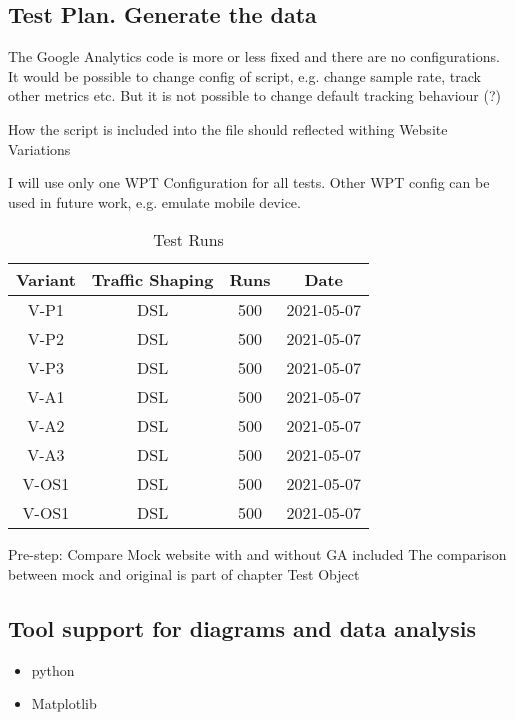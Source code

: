 \subsection{Test Plan. Generate the data}

The Google Analytics code is more or less fixed and there are no configurations.
It would be possible to change config of script, e.g. change sample rate, track other metrics etc.
But it is not possible to change default tracking behaviour (?)

How the script is included into the file should reflected withing Website Variations

I will use only one WPT Configuration for all tests.
Other WPT config can be used in future work, e.g. emulate mobile device.


\begin{table}[h]
	\caption[Test Runs]{Test Runs \cite{DBLP:books/infix/Schwarz99}}
	\label{tab:tamodelleVergleich}
	\centering
	\begin{tabular}{ |c|c|c|c| } 
	 \hline
	  Variant & Traffic Shaping & Runs & Date \\
	  \hline
	  V-P1 & DSL & 500 & 2021-05-07 \\
	  V-P2 & DSL & 500 & 2021-05-07 \\
	  V-P3 & DSL & 500 & 2021-05-07 \\
	  \hline
	  V-A1 & DSL & 500 & 2021-05-07 \\
	  V-A2 & DSL & 500 & 2021-05-07 \\
	  V-A3 & DSL & 500 & 2021-05-07 \\
	  \hline
	  V-OS1 & DSL & 500 & 2021-05-07 \\
	  V-OS1 & DSL & 500 & 2021-05-07 \\
	  \hline
	  \end{tabular}
\end{table}



Pre-step: Compare Mock website with and without GA included
The comparison between mock and original is part of chapter Test Object













\subsection{Tool support for diagrams and data analysis}

\begin{itemize}
\item python
\item Matplotlib
\end{itemize}
